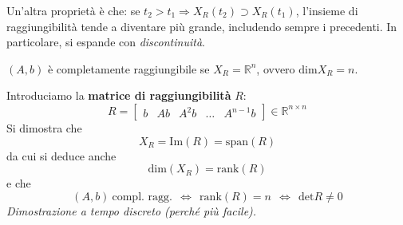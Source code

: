 \documentclass[10pt,a4paper]{book}
\begin{document}
Un'altra proprietà è che: se $t_{2}  >t_{1} \Rightarrow X_{R}( t_{2}) \supset X_{R}( t_{1})$, l'insieme di raggiungibilità tende a diventare più grande, includendo sempre i precedenti. In particolare, si espande con \textit{discontinuità}.
\begin{definition}
$( A,b)$ è completamente raggiungibile se $X_{R} =\mathbb{R}^{n}$, ovvero $\mathrm{dim} X_{R} =n$.
\end{definition}
Introduciamo la \textbf{matrice di raggiungibilità} $R$:
\begin{equation*}
\boxed{R=\begin{bmatrix}
b & Ab & A^{2} b & \dotsc  & A^{n-1} b
\end{bmatrix} \in \mathbb{R}^{n\times n}}
\end{equation*}
Si dimostra che
\begin{equation*}
X_{R} =\mathrm{Im}( R) =\mathrm{span}( R)
\end{equation*}
da cui si deduce anche
\begin{equation*}
\mathrm{dim}( X_{R}) =\mathrm{rank}( R)
\end{equation*}
e che
\begin{equation*}
( A,b) \ \text{compl. ragg.} \ \ \Leftrightarrow \ \ \mathrm{rank}( R) =n\ \ \Leftrightarrow \ \ \mathrm{det} R\neq 0
\end{equation*}
\textit{Dimostrazione a tempo discreto (perché più facile).}
\end{document}
